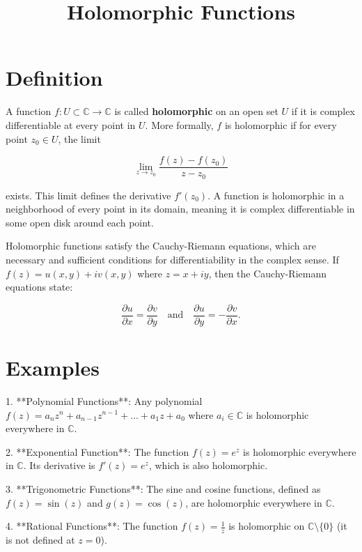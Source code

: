 \documentclass[11pt,a4paper]{article}
\title{Holomorphic Functions}
\date{}
\begin{document}
\maketitle
\section{Definition}
A function \( f: U \subset \mathbb{C} \to \mathbb{C} \) is called \textbf{holomorphic} on an open set \( U \) if it is complex differentiable at every point in \( U \). More formally, \( f \) is holomorphic if for every point \( z_0 \in U \), the limit

\begin{equation}
\lim_{z \to z_0} \frac{f(z) - f(z_0)}{z - z_0}
\end{equation}

exists. This limit defines the derivative \( f'(z_0) \). A function is holomorphic in a neighborhood of every point in its domain, meaning it is complex differentiable in some open disk around each point.

Holomorphic functions satisfy the Cauchy-Riemann equations, which are necessary and sufficient conditions for differentiability in the complex sense. If \( f(z) = u(x, y) + iv(x, y) \) where \( z = x + iy \), then the Cauchy-Riemann equations state:

\begin{equation}
\frac{\partial u}{\partial x} = \frac{\partial v}{\partial y} \quad \text{and} \quad \frac{\partial u}{\partial y} = -\frac{\partial v}{\partial x}.
\end{equation}

\section{Examples}
1. **Polynomial Functions**: Any polynomial \( f(z) = a_n z^n + a_{n-1} z^{n-1} + \ldots + a_1 z + a_0 \) where \( a_i \in \mathbb{C} \) is holomorphic everywhere in \( \mathbb{C} \).

2. **Exponential Function**: The function \( f(z) = e^z \) is holomorphic everywhere in \( \mathbb{C} \). Its derivative is \( f'(z) = e^z \), which is also holomorphic.

3. **Trigonometric Functions**: The sine and cosine functions, defined as \( f(z) = \sin(z) \) and \( g(z) = \cos(z) \), are holomorphic everywhere in \( \mathbb{C} \).

4. **Rational Functions**: The function \( f(z) = \frac{1}{z} \) is holomorphic on \( \mathbb{C} \setminus \{0\} \) (it is not defined at \( z = 0 \)).
\end{document}
